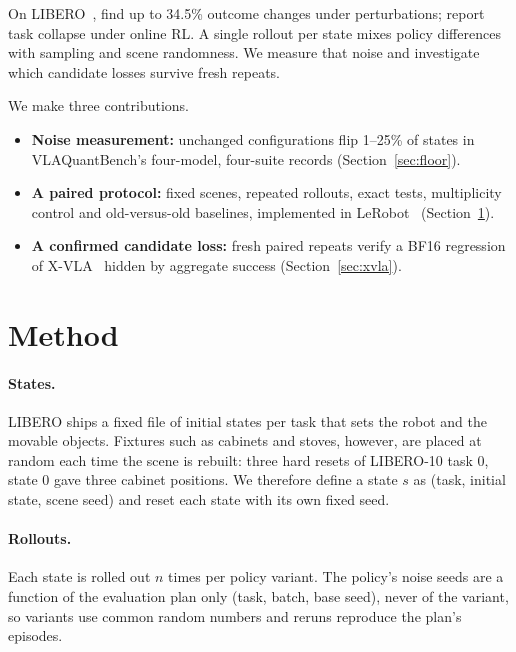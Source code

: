 \documentclass{article}
\begin{document}
On LIBERO~\citep{liu2023libero}, \citet{sawada2026paired} find up to 34.5\% outcome changes
under perturbations; \citet{yardimci2026collapse} report task collapse under online RL.
A single rollout per state mixes policy differences with sampling and scene randomness.
We measure that noise and investigate which candidate losses survive fresh repeats.

We make three contributions.
\begin{itemize}
  \item \textbf{Noise measurement:} unchanged configurations flip 1--25\% of states in
    VLAQuantBench's four-model, four-suite records (Section~\ref{sec:floor}).
  \item \textbf{A paired protocol:} fixed scenes, repeated rollouts, exact tests,
    multiplicity control and old-versus-old baselines, implemented in
    LeRobot~\citep{cadene2026lerobot} (Section~\ref{sec:method}).
  \item \textbf{A confirmed candidate loss:} fresh paired repeats verify a BF16 regression
    of X-VLA~\citep{zheng2025xvla} hidden by aggregate success (Section~\ref{sec:xvla}).
\end{itemize}

\section{Method}
\label{sec:method}

\paragraph{States.} LIBERO ships a fixed file of initial states per task that sets the robot and
the movable objects. Fixtures such as cabinets and stoves, however, are placed at random each time
the scene is rebuilt: three hard resets of LIBERO-10 task 0, state 0 gave three cabinet positions.
We therefore define a state $s$ as (task, initial state, scene seed) and reset each state with
its own fixed seed.

\paragraph{Rollouts.} Each state is rolled out $n$ times per policy variant. The policy's noise
seeds are a function of the evaluation plan only (task, batch, base seed), never of the variant,
so variants use common random numbers and reruns reproduce the plan's episodes.
\end{document}
